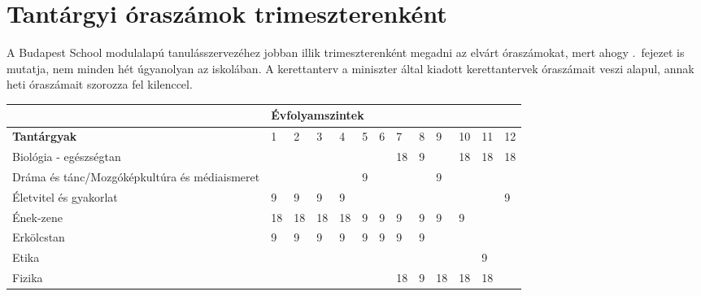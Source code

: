 \section{Tantárgyi óraszámok trimeszterenként}
A Budapest School modulalapú tanulásszervezéhez jobban illik trimeszterenként megadni az elvárt óraszámokat, mert ahogy .~fejezet is mutatja, nem minden hét úgyanolyan az iskolában. A kerettanterv a miniszter által kiadott kerettantervek óraszámait veszi alapul, annak heti óraszámait szorozza fel kilenccel. 

\begin{landscape}
\begin{table}[]
  \begin{tabular}{l|l|l|l|l|l|l|l|l|l|l|l|l}
  
                                                        & \multicolumn{12}{l}{\textbf{Évfolyamszintek}}                                                                                                                                                           \\ \hline
    \textbf{Tantárgyak}                                          & 1                                     & 2           & 3           & 4           & 5           & 6           & 7           & 8           & 9           & 10          & 11          & 12          \\ \hline
    Biológia - egészségtan                              &     &     &     &     &     &     & 18  & 9   &     & 18  & 18  & 18  \\\hline
    Dráma és tánc/Mozgóképkultúra és médiaismeret       &     &     &     &     & 9   &     &     &     & 9   &     &     &     \\ \hline
    Életvitel és gyakorlat                              & 9   & 9   & 9   & 9   &     &     &     &     &     &     &     & 9   \\\hline
    Ének-zene                                           & 18  & 18  & 18  & 18  & 9   & 9   & 9   & 9   & 9   & 9   &     &     \\\hline
    Erkölcstan                                          & 9   & 9   & 9   & 9   & 9   & 9   & 9   & 9   &     &     &     &     \\\hline
    Etika                                               &     &     &     &     &     &     &     &     &     &     & 9   &     \\\hline
    Fizika                                              &     &     &     &     &     &     & 18  & 9   & 18  & 18  & 18  &     \\\hline

\end{tabular}
\end{table}
\end{landscape}
